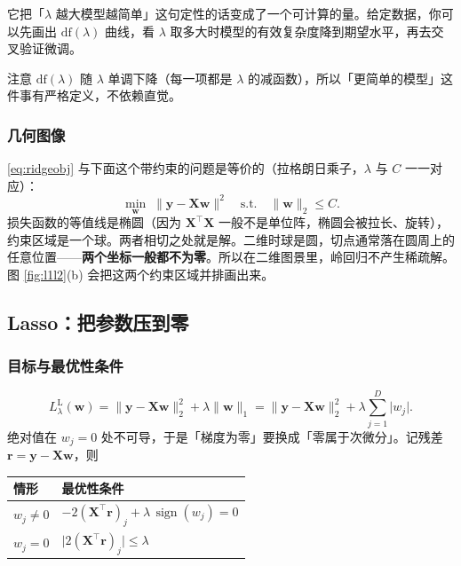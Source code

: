 \documentclass[11pt,a4paper,fontset=windows,zihao=-4]{ctexart}
\newcommand{\bX}{\mathbf{X}}
\newcommand{\by}{\mathbf{y}}
\newcommand{\bw}{\mathbf{w}}
\newcommand{\tp}{^{\top}}
\newcommand{\norm}[1]{\lVert #1\rVert}
\newcommand{\abs}[1]{\lvert #1\rvert}
\DeclareMathOperator{\sign}{sign}
\newcommand{\tabhead}{\sffamily\bfseries\color{navy}}
\begin{document}
\begin{add}[有效自由度的用处]
它把「$\lambda$ 越大模型越简单」这句定性的话变成了一个可计算的量。给定数据，你可以先画出 $\mathrm{df}(\lambda)$ 曲线，看 $\lambda$ 取多大时模型的有效复杂度降到期望水平，再去交叉验证微调。

注意 $\mathrm{df}(\lambda)$ 随 $\lambda$ 单调下降（每一项都是 $\lambda$ 的减函数），所以「更简单的模型」这件事有严格定义，不依赖直觉。
\end{add}

\subsubsection{几何图像}

\eqref{eq:ridgeobj} 与下面这个带约束的问题是等价的（拉格朗日乘子，$\lambda$ 与 $C$ 一一对应）：
\begin{equation}
  \min_{\bw}\;\norm{\by-\bX\bw}^2
  \quad\text{s.t.}\quad \norm{\bw}_2\le C .
  \label{eq:ridgecon}
\end{equation}
损失函数的等值线是椭圆（因为 $\bX\tp\bX$ 一般不是单位阵，椭圆会被拉长、旋转），约束区域是一个球。两者相切之处就是解。二维时球是圆，切点通常落在圆周上的任意位置——\textbf{两个坐标一般都不为零}。所以在二维图景里，岭回归不产生稀疏解。图 \ref{fig:l1l2}(b) 会把这两个约束区域并排画出来。

\subsection{Lasso：把参数压到零}

\subsubsection{目标与最优性条件}

\begin{equation}
  L^{\text{L}}_\lambda(\bw)=\norm{\by-\bX\bw}_2^2+\lambda\norm{\bw}_1
  =\norm{\by-\bX\bw}_2^2+\lambda\sum_{j=1}^{D}\abs{w_j} .
  \label{eq:lassoobj}
\end{equation}
绝对值在 $w_j=0$ 处不可导，于是「梯度为零」要换成「零属于次微分」。记残差 $\mathbf r=\by-\bX\bw$，则

\begin{center}
\small
\begin{tabular}{@{}ll@{}}
\toprule
\rowcolor{navy!7}
\tabhead 情形 & \tabhead 最优性条件\\
\midrule
$w_j\neq0$ & $-2(\bX\tp\mathbf r)_j+\lambda\,\sign(w_j)=0$\\[2pt]
$w_j=0$   & $\abs{2(\bX\tp\mathbf r)_j}\le\lambda$\\
\bottomrule
\end{tabular}
\end{center}
\end{document}

